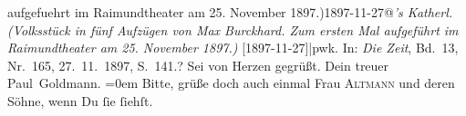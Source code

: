 \begin{ledgroupsized}[t]{13cm}
{{{{                  aufgefuehrt im Raimundtheater am 25. November 1897.)1897-11-27@\strich\emph{’s Katherl. (Volksstück in fünf Aufzügen von Max Burckhard. Zum ersten Mal aufgeführt im Raimundtheater am 25. November 1897.)} {[}1897-11-27{]}|pwk}. In:
                        \emph{Die Zeit}, Bd. 13, Nr. 165, 27. 11. 1897, S. 141.}}}\label{K_L02833-9h}?\pend
           \pstart
           Sei von Herzen gegrüßt.\pend
           \pstart
           Dein treuer {\\[\baselineskip]}\spacefill\mbox{Paul Goldmann.}\pend
           \leftskip=0em{}\pstart
           \noindent{}Bitte, grüße doch auch einmal Frau \textsc{Altmann} und deren {\pb}Söhne, wenn Du
                  ſie ſiehſt.\pend
           
         
         \endnumbering{}\end{ledgroupsized}  \newcommand{\dateiname}{L02833}\newcommand{\titel}{Paul Goldmann an Arthur Schnitzler, 10. 12. [1897]}\newcommand{\editorInnen}{Martin Anton Müller und Laura Untner}
      